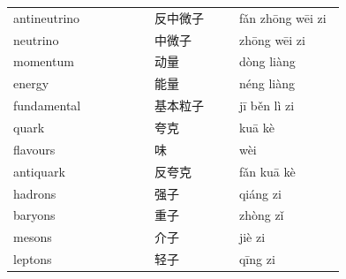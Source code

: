\documentclass[11pt]{article}
\begin{document}
\begin{longtable}{@{}p{0.40\linewidth}p{0.24\linewidth}p{0.30\linewidth}@{}}
antineutrino & 反中微子 & fǎn zhōng wēi zi \\
neutrino & 中微子 & zhōng wēi zi \\
momentum & 动量 & dòng liàng \\
energy & 能量 & néng liàng \\
fundamental & 基本粒子 & jī běn lì zi \\
quark & 夸克 & kuā kè \\
flavours & 味 & wèi \\
antiquark & 反夸克 & fǎn kuā kè \\
hadrons & 强子 & qiáng zi \\
baryons & 重子 & zhòng zǐ \\
mesons & 介子 & jiè zi \\
leptons & 轻子 & qīng zi \\
\end{longtable}
\end{document}
